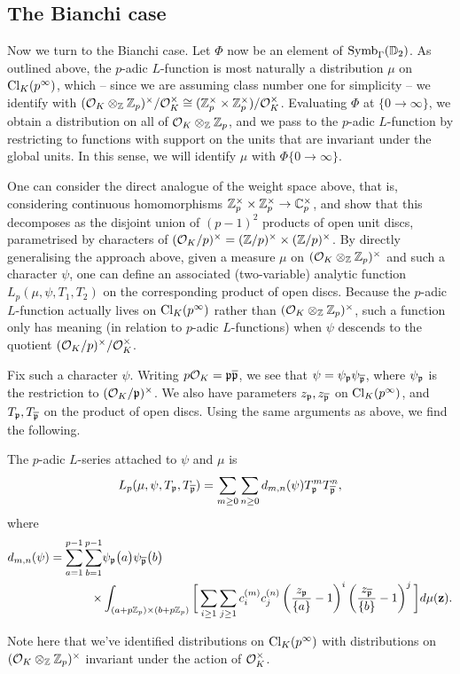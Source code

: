 \documentclass[a4paper,10pt]{article}
\numberwithin{equation}{section}
\begin{document}
\subsection{The Bianchi case}
Now we turn to the Bianchi case. Let $\Phi$ now be an element of $\mathrm{Symb}_{\Gamma}(\mathbb{D}_2)$. As outlined above, the $p$-adic $L$-function is most naturally a distribution $\mu$ on $\mathrm{Cl}_K(p^\infty)$, which -- since we are assuming class number one for simplicity -- we identify with $(\mathcal{O}_K\otimes_{\mathbb{Z}}\mathbb{Z}_p)^\times/\mathcal{O}_K^\times \cong (\mathbb{Z}_p^\times \times \mathbb{Z}_p^\times)/\mathcal{O}_K^\times$. Evaluating $\Phi$ at $\{0\rightarrow\infty\}$, we obtain a distribution on all of $\mathcal{O}_K\otimes_{\mathbb{Z}} \mathbb{Z}_p$, and we pass to the $p$-adic $L$-function by restricting to functions with support on the units that are invariant under the global units. In this sense, we will identify $\mu$ with $\Phi\{0\rightarrow\infty\}$.

One can consider the direct analogue of the weight space above, that is, considering continuous homomorphisms $\mathbb{Z}_p^\times \times \mathbb{Z}_p^\times \rightarrow \mathbb{C}_p^\times$, and show that this decomposes as the disjoint union of $(p-1)^2$ products of open unit discs, parametrised by characters of $(\mathcal{O}_K/p)^\times = (\mathbb{Z}/p)^\times \times (\mathbb{Z}/p)^\times$. By directly generalising the approach above, given a measure $\mu$ on $(\mathcal{O}_K\otimes_{\mathbb{Z}}\mathbb{Z}_p)^\times$ and such a character $\psi$, one can define an associated (two-variable) analytic function $L_p(\mu,\psi,T_1,T_2)$ on the corresponding product of open discs. Because the $p$-adic $L$-function actually lives on $\mathrm{Cl}_K(p^\infty)$ rather than $(\mathcal{O}_K\otimes_{\mathbb{Z}}\mathbb{Z}_p)^\times$, such a function only has meaning (in relation to $p$-adic $L$-functions) when $\psi$ descends to the quotient $(\mathcal{O}_K/p)^\times/\mathcal{O}_K^\times$.

Fix such a character $\psi$. Writing $p\mathcal{O}_K = \mathfrak{p}\overline{\mathfrak{p}}$, we see that $\psi = \psi_{\mathfrak{p}}\psi_{\overline{\mathfrak{p}}}$, where $\psi_{\mathfrak{p}}$ is the restriction to $(\mathcal{O}_K/\mathfrak{p})^\times$. We also have parameters $z_{\mathfrak{p}}, z_{\overline{\mathfrak{p}}}$ on $\mathrm{Cl}_K(p^\infty)$, and $T_{\mathfrak{p}}, T_{\overline{\mathfrak{p}}}$ on the product of open discs. Using the same arguments as above, we find the following.

\begin{proposition}
The $p$-adic $L$-series attached to $\psi$ and $\mu$ is
\[
	L_p(\mu,\psi,T_{\mathfrak{p}},T_{\overline{\mathfrak{p}}}) = \sum_{m\geq 0}\sum_{n\geq 0} d_{m,n}(\psi) T_{\mathfrak{p}}^mT_{\overline{\mathfrak{p}}}^n,
\]
where
\begin{align*} 
    d_{m,n}(\psi) = \sum_{a=1}
^{p-1}\sum_{b=1}^{p-1} &\psi_{\mathfrak{p}}\big(a\big) \psi_{\overline{\mathfrak{p}}}\big(b\big) \\
\times &\int_{(a+p\mathbb{Z}_p) \times (b+p\mathbb{Z}_p)} \bigg[ \sum_{i\geq 1} \sum_{j\geq 1} c_i^{(m)} c_j^{(n)} \left(\frac{z_{\mathfrak{p}}}{\{a\}}-1\right)^i \left(\frac{z_{\overline{\mathfrak{p}}}}{\{b\}}-1\right)^j \bigg]d\mu(\mathbf{z}) .
\end{align*}
\end{proposition}
Note here that we've identified distributions on $\mathrm{Cl}_K(p^\infty)$ with distributions on $(\mathcal{O}_K\otimes_{\mathbb{Z}}\mathbb{Z}_p)^\times$ invariant under the action of $\mathcal{O}_K^\times$.
\end{document}
